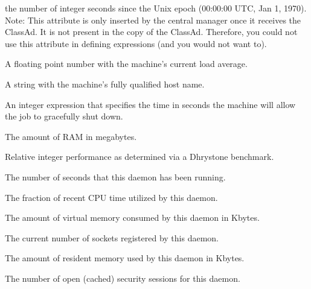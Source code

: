 \begin{description}
the number of integer seconds since the Unix epoch (00:00:00 UTC, Jan 1, 1970).
Note: This attribute is only inserted by the central manager once it
receives the ClassAd.
It is not present in the  copy of the ClassAd.
Therefore, you could not use this attribute in defining 
expressions (and you would not want to).
%
\item[\AdAttr{LoadAvg}:] A floating point number with the machine's current load
average.
%
\item[\AdAttr{Machine}:] A string with the machine's fully qualified host name.
%
\item[\AdAttr{MachineMaxVacateTime}:] An integer expression that specifies
the time in seconds the machine will allow the job to gracefully shut
down.
%
\item[\AdAttr{Memory}:] The amount of RAM in megabytes.
%
\item[\AdAttr{Mips}:] Relative integer performance as determined via a Dhrystone
benchmark.

\item[\AdAttr{MonitorSelfAge}:] The number of seconds that this daemon
  has been running.

\item[\AdAttr{MonitorSelfCPUUsage}:] The fraction of recent CPU time utilized
  by this daemon. 

\item[\AdAttr{MonitorSelfImageSize}:] The amount of virtual memory consumed by
  this daemon in Kbytes.

\item[\AdAttr{MonitorSelfRegisteredSocketCount}:] The current number of sockets
  registered by this daemon.

\item[\AdAttr{MonitorSelfResidentSetSize}:] The amount of resident memory
  used by this daemon in Kbytes.

\item[\AdAttr{MonitorSelfSecuritySessions}:] The number of open (cached)
  security sessions for this daemon.


\end{description}
